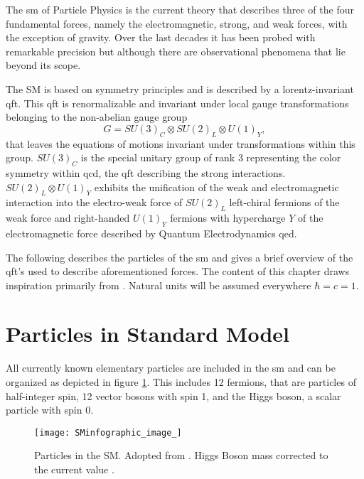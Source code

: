 The \ac{sm} of Particle Physics is the current theory that describes three of the four fundamental forces, namely the electromagnetic, strong, and weak forces, with the exception of gravity. Over the last decades it has been probed with remarkable precision but although there are  observational phenomena that lie beyond its scope.

The SM is based on symmetry principles and is described by a lorentz-invariant \ac{qft}. This \ac{qft} is renormalizable and invariant under local gauge transformations belonging to the non-abelian gauge group
\begin{equation}
    G = SU(3)_C \otimes SU(2)_L \otimes U(1)_Y,
\end{equation}
that leaves the equations of motions invariant under transformations within this group. $SU(3)_C$ is the special unitary group of rank 3 representing the color symmetry within \ac{qcd}, the \ac{qft} describing the strong interactions. $SU(2)_L \otimes U(1)_Y$ exhibits the unification of the weak and electromagnetic interaction into the electro-weak force of $SU(2)_L$ left-chiral fermions of the weak force and right-handed $U(1)_Y$ fermions with hypercharge $Y$ of the electromagnetic force described by Quantum Electrodynamics \ac{qed}.

The following describes the particles of the \ac{sm} and gives a brief overview of the \ac{qft}'s used to describe aforementioned forces. The content of this chapter draws inspiration primarily from \citep{hollik2010quantum,griffiths2020introduction,thomson2013modern,zee2010quantum}. Natural units will be assumed everywhere $\hbar=c=1$.


\section{Particles in Standard Model}

All currently known elementary particles are included in the \ac{sm} and can be organized as depicted in figure \ref{fig:sm}. This includes 12 fermions, that are particles of half-integer spin, 12 vector bosons with spin 1, and the Higgs boson, a scalar particle with spin 0.


\begin{figure}
    \centering
    \texttt{[image: SMinfographic\_image\_]}
    \caption[]{Particles in the SM. Adopted from \citep{smpar}. Higgs Boson mass corrected to the current value \citep{particle2022review}. }
    \label{fig:sm}
\end{figure}


